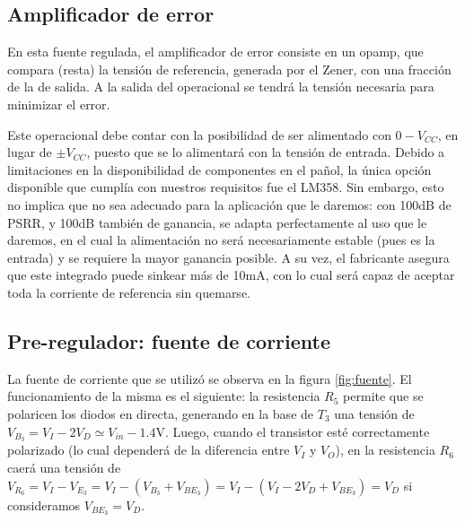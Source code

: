 \documentclass[e2_tp1_main.tex]{subfiles}
\begin{document}
  
 \subsection{Amplificador de error}

En esta fuente regulada, el amplificador de error consiste en un opamp, que compara (resta) la tensi\'on de referencia, generada por el Zener, con una fracci\'on de la de salida. A la salida del operacional se tendr\'a la tensi\'on necesaria para minimizar el error. 

Este operacional debe contar con la posibilidad de ser alimentado con $0 - V_{CC}$, en lugar de $\pm V_{CC}$, puesto que se lo alimentar\'a con la tensi\'on de entrada. Debido a limitaciones en la disponibilidad de componentes en el pa\~nol, la \'unica opci\'on disponible que cumpl\'ia con nuestros requisitos fue el LM358. Sin embargo, esto no implica que no sea adecuado para la aplicaci\'on que le daremos: con 100dB de PSRR, y 100dB tambi\'en de ganancia, se adapta perfectamente al uso que le daremos, en el cual la alimentaci\'on no ser\'a necesariamente estable (pues es la entrada) y se requiere la mayor ganancia posible. A su vez, el fabricante asegura que este integrado puede sinkear m\'as de 10mA, con lo cual ser\'a capaz de aceptar toda la corriente de referencia sin quemarse.


\subsection{Pre-regulador: fuente de corriente}

La fuente de corriente que se utiliz\'o se observa en la figura \ref{fig:fuente}. El funcionamiento de la misma es el siguiente: la resistencia $R_5$ permite que se polaricen los diodos en directa, generando en la base de $T_3$ una tensi\'on de $V_{B_3}=V_{I} - 2 V_D \simeq V_{in} - 1.4\mathrm{V}$. Luego, cuando el transistor est\'e correctamente polarizado (lo cual depender\'a de la diferencia entre $V_I$ y $V_O$), en la resistencia $R_6$ caer\'a una tensi\'on de $V_{R_6} = V_I - V_{E_3} = V_I - (V_{B_3} + V_{BE_3}) = V_I - (V_I - 2V_D + V_{BE_3}) = V_D$ si consideramos $V_{BE_3} = V_D$.
\end{document}
